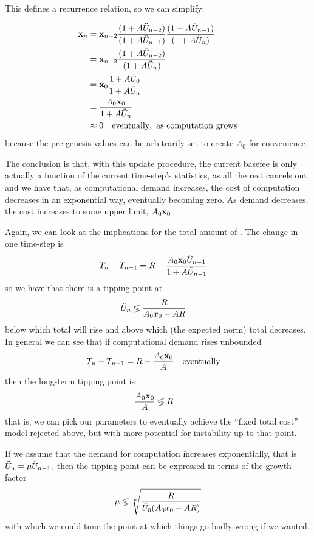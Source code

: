 \documentclass[11pt,a4paper]{article}
\begin{document}
This defines a recurrence relation, so we can simplify:

\begin{align}
\mathbf x_n &= \mathbf x_{n-2} \frac{(1 + A\ddot{U}_{n-2})}{(1 + A\ddot{U}_{n-1})}\frac{(1 + A\ddot{U}_{n-1})}{(1 + A\ddot{U}_n)}\\
       &= \mathbf x_{n-2} \frac{(1 + A\ddot{U}_{n-2})}{(1 + A\ddot{U}_n)}\\
       &= \mathbf x_0 \frac{1 + A\ddot{U}_0}{1 + A\ddot{U}_n}\\
       &= \frac{A_0\mathbf x_0}{1 + A\ddot{U}_n}\\
       &\approx 0 \quad\mathrm{eventually,\ as\ computation\ grows}
\end{align}
because the pre-genesis values can be arbitrarily set to create $A_0$ for convenience. 

The conclusion is that, with this update procedure, the current basefee is only actually a function of the current time-step's statistics, as all the rest cancels out and we have that, as computational demand increases, the cost of computation decreases in an exponential way, eventually becoming zero. As demand decreases, the cost increases to some upper limit, $A_0\mathbf x_0$.

Again, we can look at the implications for the total amount of \ether. The change in one time-step is
\begin{align}
T_n - T_{n-1} &= R - \frac{A_0\mathbf x_0\ddot{U}_{n-1}}{1 + A\ddot{U}_{n-1}}
\end{align}
so we have that there is a tipping point at
\begin{align}
\ddot{U}_n &\lessgtr \frac{R}{A_0x_0 - AR}
\end{align}
below which total \ether will rise and above which (the expected norm) total \ether decreases. In general we can see that if computational demand rises unbounded
\begin{align}
T_n - T_{n-1} &= R - \frac{A_0\mathbf x_0}{A} \quad\mathrm{eventually}
\end{align}
then the long-term tipping point is
\begin{align}
\frac{A_0\mathbf x_0}{A} &\lessgtr R
\end{align}
that is, we can pick our parameters to eventually achieve the ``fixed total cost'' model rejected above, but with more potential for instability up to that point.

If we assume that the demand for computation \U increases exponentially, that is $\ddot{U}_n = \mu\ddot{U}_{n-1}$, then the tipping point can be expressed in terms of the growth factor
\begin{equation}
\mu \lessgtr \sqrt[n]{\frac{R}{\ddot{U}_0(A_0x_0 - AR)}}
\end{equation}
with which we could tune the point at which things go badly wrong if we wanted.
\end{document}
